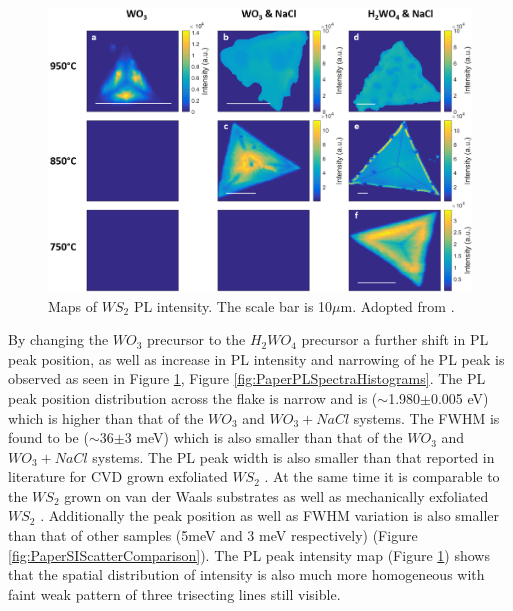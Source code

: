 \begin{figure}[h]
	\begin{center}
		\includegraphics[scale=0.3]{PaperPLMaps.png}
		\caption{Maps of $WS_2$ PL intensity. The scale bar is 10$\mu$m. Adopted from \cite{Reale2017}.}
		\label{fig:PaperPLMaps}
	\end{center}
\end{figure}

By changing the $WO_3$ precursor to the $H_2WO_4$ precursor a further shift in PL peak position, as well as increase in PL intensity and narrowing of he PL peak is observed as seen in Figure \ref{fig:PaperPLMaps}, Figure \ref{fig:PaperPLSpectraHistograms}. The PL peak position distribution across the flake is narrow and is ({$\sim$}1.980{$\pm$}0.005 eV) which is higher than that of the $WO_3$ and $WO_3 + NaCl$ systems. The FWHM is found to be ({$\sim$}36{$\pm$}3 meV) which is also smaller than that of the $WO_3$ and $WO_3 + NaCl$ systems. The PL peak width is also smaller than that reported in literature for CVD grown \cite{ExtraordinaryRoomTemperaturePhotoluminescenceInTriangularWS2Monolayers}\cite{Rong2014}\cite{Hu2016}\cite{Kang2015a} exfoliated $WS_2$ \cite{EvolutionOfElectronicStructureInAtomicallyThinSheetsOfWS2AndWSe2}\cite{doi:10.1021/nn5059908}. At the same time it is comparable to the $WS_2$ grown on van der Waals substrates \cite{doi:10.1021/nn503093k} as well as mechanically exfoliated $WS_2$ \cite{doi:10.1021/nl500171v}. Additionally the peak position as well as FWHM variation is also smaller than that of other samples (5meV and 3 meV respectively) (Figure \ref{fig:PaperSIScatterComparison}). The PL peak intensity map (Figure \ref{fig:PaperPLMaps}) shows that the spatial distribution of intensity is also much more homogeneous with faint weak pattern of three trisecting lines still visible.

